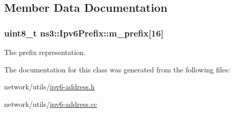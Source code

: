 \subsection{Member Data Documentation}
\subsubsection[{\texorpdfstring{m\+\_\+prefix}{m_prefix}}]{\setlength{\rightskip}{0pt plus 5cm}uint8\+\_\+t ns3\+::\+Ipv6\+Prefix\+::m\+\_\+prefix\mbox{[}16\mbox{]}\hspace{0.3cm}{\ttfamily [private]}}\hypertarget{classns3_1_1Ipv6Prefix_a57fe096b66e6bc4330a195e0a2aa2407}{}\label{classns3_1_1Ipv6Prefix_a57fe096b66e6bc4330a195e0a2aa2407}


The prefix representation. 



The documentation for this class was generated from the following files\+:\begin{DoxyCompactItemize}
\item 
network/utils/\hyperlink{ipv6-address_8h}{ipv6-\/address.\+h}\item 
network/utils/\hyperlink{ipv6-address_8cc}{ipv6-\/address.\+cc}\end{DoxyCompactItemize}
